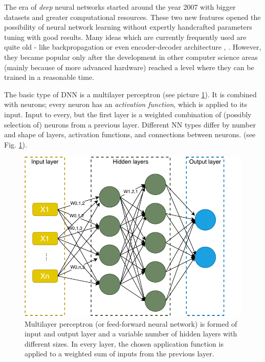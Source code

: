 The era of \textit{deep} neural networks started around the year 2007 \citep{Goodfellow-et-al-2016} with bigger datasets and greater computational resources. These two new features opened the possibility of neural network learning without expertly handcrafted parameters tuning with good results.
Many ideas which are currently frequently used are quite old - like backpropagation \citep{Rumelhart} or even encoder-decoder architecture \citep{Allen19}, \citep{Forcada1997}. However, they became popular only after the development in other computer science areas (mainly because of more advanced hardware) reached a level where they can be trained in a reasonable time.
\par
The basic type of DNN is a multilayer perceptron (see picture \ref{pic:multilayer}).
It is combined with neurons; every neuron has an \textit{activation function}, which is applied to its input. Input to every, but the first layer is a weighted combination of (possibly selection of) neurons from a previous layer. 
Different NN types differ by number and shape of layers, activation functions, and connections between neurons. (see Fig. \ref{pic:multilayer}).
\begin{figure}[ht]
\centering
\includegraphics[width=1\columnwidth]{../img/multilayer}
\caption{Multilayer perceptron (or feed-forward neural network) is formed of input and output layer and a variable number of hidden layers with different sizes. In every layer, the chosen application function is applied to a weighted sum of inputs from the previous layer.}
\label{pic:multilayer}
\end{figure}
\par
